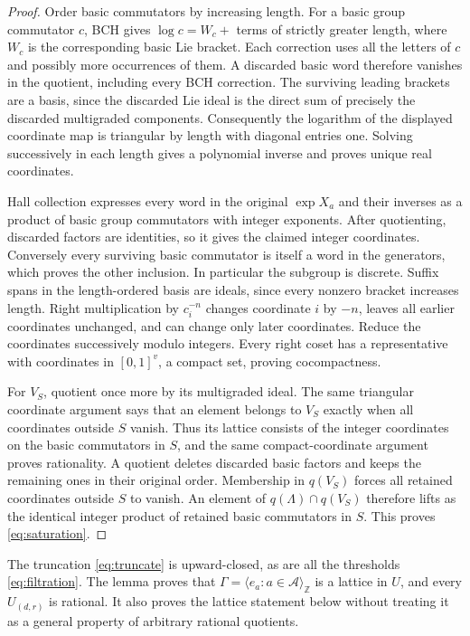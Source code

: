 \documentclass[11pt]{article}
\newcommand{\Z}{\mathbb Z}\newcommand{\N}{\mathbb N}
\begin{document}
\begin{proof}
Order basic commutators by increasing length. For a basic group commutator
$c$, BCH gives $\log c=W_c+$ terms of strictly greater length, where $W_c$
is the corresponding basic Lie bracket. Each correction uses all the letters
of $c$ and possibly more occurrences of them. A discarded basic word
therefore vanishes in the quotient, including every BCH correction.
The surviving leading brackets are a basis, since the discarded Lie ideal
is the direct sum of precisely the discarded multigraded components.
Consequently the logarithm of the displayed coordinate map is triangular
by length with diagonal entries one. Solving successively in each length
gives a polynomial inverse and proves unique real coordinates.

Hall collection expresses every word in the original $\exp X_a$ and their
inverses as a product of basic group commutators with integer exponents.
After quotienting, discarded factors are identities, so it gives the claimed
integer coordinates. Conversely every surviving basic commutator is itself
a word in the generators, which proves the other inclusion. In particular
the subgroup is discrete. Suffix spans in the length-ordered basis are ideals,
since every nonzero bracket increases length. Right multiplication by
$c_i^{-n}$ changes coordinate $i$ by $-n$, leaves all earlier coordinates
unchanged, and can change only later coordinates. Reduce the coordinates
successively modulo integers. Every right coset has a representative with
coordinates in $[0,1]^v$, a compact set, proving cocompactness.

For $V_S$, quotient once more by its multigraded ideal. The same triangular
coordinate argument says that an element belongs to $V_S$ exactly when all
coordinates outside $S$ vanish. Thus its lattice consists of the integer
coordinates on the basic commutators in $S$, and the same compact-coordinate
argument proves rationality. A quotient deletes discarded basic factors and
keeps the remaining ones in their original order. Membership in $q(V_S)$
forces all retained coordinates outside $S$ to vanish. An element of
$q(\Lambda)\cap q(V_S)$ therefore lifts as the identical integer product
of retained basic commutators in $S$. This proves \eqref{eq:saturation}.
\end{proof}

The truncation \eqref{eq:truncate} is upward-closed, as are all the thresholds
\eqref{eq:filtration}. The lemma proves that
$\Gamma=\langle e_a:a\in\mathcal A\rangle_{\Z}$ is a lattice in $U$, and
every $U_{(d,r)}$ is rational. It also proves the lattice statement below
without treating it as a general property of arbitrary rational quotients.
\end{document}

